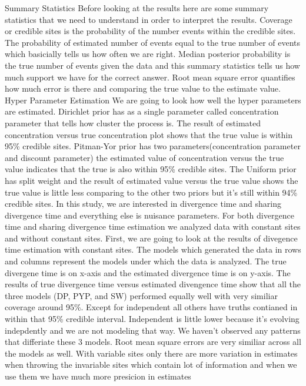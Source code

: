 \documentclass[letterpaper,12pt]{article}
\begin{document}
Summary Statistics
Before looking at the results here are some summary statistics that we need to 
understand in order to interpret the results. Coverage or credible sites is the probability
of the number events within the credible sites. The probability of estimated number 
of events equal to the true number of events which basicially tells us how often we 
are right. Median posterior probability is the true number of events given the data 
and this summary statistics tells us how much support we have for the correct answer.
Root mean square error quantifies how much error is there and comparing the true 
value to the estimate value. 
Hyper Parameter Estimation 
We are going to look how well the hyper parameters are estimated. Dirichlet
prior has as a single parameter called concentration parameter that tells how cluster 
the process is. The result of estimated concentration versus true concentration plot
shows that the true value is within 95\% credible sites. Pitman-Yor prior has two 
parameters(concentration parameter and discount parameter) the estimated value of 
concentration versus the true value indicates that the true is also within 95\%
credible sites. The Uniform prior has split weight and the result of estimated value 
versus the true value shows the true value is little less comparing to the other two 
priors but it's still within 94\% credible sites.
In this study, we are interested in divergence time and sharing divergence time and 
everything else is nuisance parameters. For both divergence time and sharing divergence time 
estimation we analyzed data with constant sites and without constant sites. First, we are going 
to look at the results of divegence time estimation with constant sites. The models which generated 
the data in rows and columns represent the models under which the data is analyzed. The true divergene 
time is on x-axis and the estimated divergence time is on y-axis. The results of true divergence 
time versus estimated divengence time show that all the three models (DP, PYP, and SW) performed
equally well with very similiar coverage around 95\%. Except for independent all others have truths 
contianed in within that 95\% credible interval. Independent is little lower because it's evolving 
indepdently and we are not modeling that way. We haven't observed any patterns that differiate
these 3 models. Root mean square errors are very similiar across all the models as well. 
With variable sites only there are more variation in estimates when throwing the invariable 
sites which contain lot of information and when we use them we have much more presicion in estimates
\end{document}
